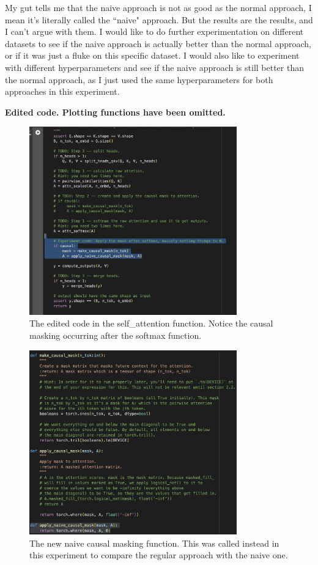 \documentclass{article}
\begin{document}
My gut tells me that the naive approach is not as good as the normal approach, I
mean it's literally called the ``naive" approach. But the results are the
results, and I can't argue with them. I would like to do further experimentation
on different datasets to see if the naive approach is actually better than the
normal approach, or if it was just a fluke on this specific dataset. I would
also like to experiment with different hyperparameters and see if the naive
approach is still better than the normal approach, as I just used the same
hyperparameters for both approaches in this experiment.

\newpage

\textbf{Edited code. Plotting functions have been omitted.}
\begin{figure}[htbp]
    \centering
    \includegraphics[width=0.8\textwidth]{plots/self_attention.png}
    \caption{The edited code in the self\_attention function. Notice the causal
    masking occurring after the softmax function.}
    \label{fig:selfattention}
\end{figure}

\begin{figure}[htbp]
    \centering
    \includegraphics[width=0.8\textwidth]{plots/apply_naive_causal_mask.png}
    \caption{The new naive causal masking function. This was called instead in
    this experiment to compare the regular approach with the naive one.}
    \label{fig:naive_causal_masking}
\end{figure}
\end{document}
